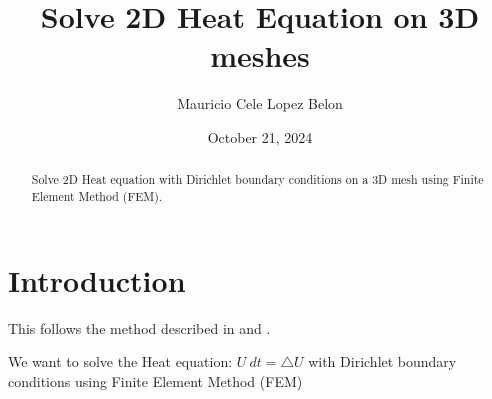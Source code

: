 \documentclass{birkjour}
\numberwithin{equation}{section}
\begin{document}
%
%
%
%
%
%
%
%
%


\title[Solve 2D Heat Equation on 3D meshes]
 {Solve 2D Heat Equation on 3D meshes}

\author[Mauricio Cele Lopez Belon]{Mauricio Cele Lopez Belon}
\address{Madrid, Spain}



\date{October 21, 2024}

\begin{abstract}

Solve 2D Heat equation with Dirichlet boundary conditions on a 3D mesh using Finite Element Method (FEM).

\end{abstract}

\maketitle
\section{Introduction}


This follows the method described in \cite{Sayas2015} and \cite{Langtangen2014}.

We want to solve the Heat equation: $U \ dt = \bigtriangleup U$ with Dirichlet boundary conditions
using Finite Element Method (FEM)
\end{document}
